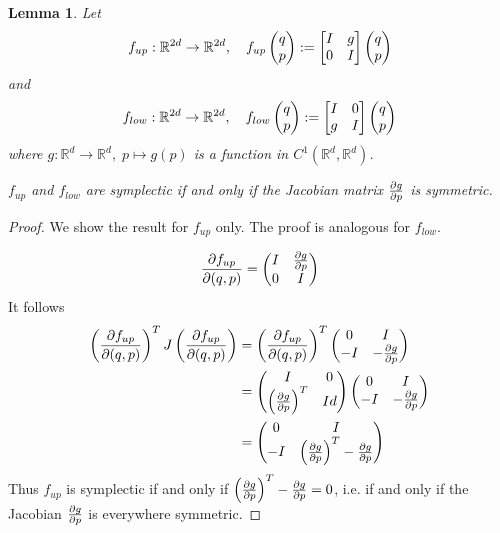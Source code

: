 \documentclass[twoside,a4paper]{article}
\newtheorem{lemma}{Lemma}
\begin{document}
\begin{lemma}\label{jacobi_symmetric}
	Let
	\begin{equation*}
		f_{up} : \mathbb{R}^{2d} \to \mathbb{R}^{2d},\quad
		f_{up} \qpvec := \uppersympop{g}
	\end{equation*}
	and
	\begin{equation*}
		f_{low} : \mathbb{R}^{2d} \to \mathbb{R}^{2d},\quad
		f_{low} \qpvec := \lowersympop{g}
	\end{equation*}
	where $g: \mathbb{R}^d \to \mathbb{R}^d,\; p \mapsto g(p)$ is a function in 
	$C^1(\mathbb{R}^d, \mathbb{R}^d)$. 

	$f_{up}$ and $f_{low}$ are symplectic if and only if the Jacobian matrix $\jac{g}{p}$
	is symmetric.
\end{lemma}
\begin{proof}
	We show the result for $f_{up}$ only. The proof is analogous for $f_{low}$.

	\begin{equation*}
		\deldel[f_{up}]{(q,p)} = \begin{pmatrix}
			I & \deldel[g]{p} \\
			0 & I
		\end{pmatrix}
	\end{equation*}
	It follows
	\begin{align*}
		\jacp{f_{up}}{(q,p)}^T J \jacp{f_{up}}{(q,p)} 
		&= \left(\deldel[f_{up}]{(q,p)}\right)^T \begin{pmatrix}
			0 & I \\
			-I & -\jac{g}{p}
		\end{pmatrix} \\
		&= \begin{pmatrix}
			I & 0 \\
			\jacp{g}{p}^T & Id
		\end{pmatrix} \begin{pmatrix}
			0 & I \\
			-I & -\jac{g}{p}
		\end{pmatrix} \\
		&= \begin{pmatrix}
			0 & I \\
			-I & \jacp{g}{p}^T-\jac{g}{p}
		\end{pmatrix}
	\end{align*}
	Thus $f_{up}$ is symplectic if and only if $\jacp{g}{p}^T-\jac{g}{p}=0$, 
	i.e. if and only if the Jacobian $\deldel[g]{p}$ is everywhere symmetric.
\end{proof}
\end{document}
